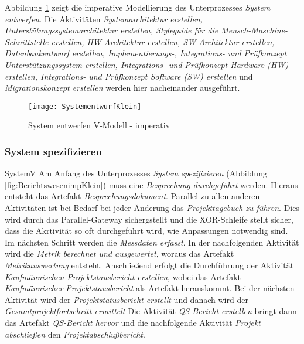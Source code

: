 Abbildung \ref{fig:SystementwurfKlein} zeigt die imperative Modellierung des Unterprozesses \textit{System entwerfen}.\newline
Die Aktivitäten \textit{Systemarchitektur erstellen, Unterstütungssystemarchitektur erstellen, Styleguide für die Mensch-Maschine-Schnittstelle erstellen, HW-Architektur erstellen, SW-Architektur erstellen, Datenbankentwurf erstellen, Implementierungs-, Integrations- und Prüfkonzept Unterstützungssystem erstellen, Integrations- und Prüfkonzept Hardware (HW) erstellen, Integrations- und Prüfkonzept Software (SW) erstellen} und \textit{Migrationskonzept erstellen} werden hier nacheinander ausgeführt.
\begin{figure}[!htbp]
\begin{center}
  \texttt{[image: SystementwurfKlein]} %
  \caption{System entwerfen V-Modell - imperativ}
  \label{fig:SystementwurfKlein}
\end{center}
\end{figure}


\subsubsection{System spezifizieren}

SystemV
Am Anfang des Unterprozesses \textit{System spezifizieren} (Abbildung \ref{fig:BerichtswesenimpKlein}) muss eine \textit{Besprechung durchgeführt} werden. Hieraus entsteht das Artefakt \textit{Besprechungsdokument}.\newline
Parallel zu allen anderen Aktivitäten ist bei Bedarf bei jeder Änderung das \textit{Projekttagebuch zu führen}. Dies wird durch das Parallel-Gateway sichergstellt und die XOR-Schleife stellt sicher, dass die Akrtivität so oft durchgeführt wird, wie Anpassungen notwendig sind. \newline
Im nächsten Schritt werden die \textit{Messdaten erfasst}.\newline
In der nachfolgenden Aktivität wird die \textit{Metrik berechnet und ausgewertet}, woraus das Artefakt \textit{Metrikauswertung} entsteht.\newline
Anschließend erfolgt die Durchführung der Aktivität \textit{Kaufmännischen Projektstausbericht erstellen}, wobei das Artefakt \textit{Kaufmännischer Projektstausbericht} als Artefakt herauskommt.\newline
Bei der nächsten Aktivität wird der \textit{Projektstatusbericht erstellt} und danach wird der \textit{Gesamtprojektfortschritt ermittelt}\newline
Die Aktivität \textit{QS-Bericht erstellen} bringt dann das Artefakt \textit{QS-Bericht hervor} und die nachfolgende Aktivität \textit{Projekt abschließen} den \textit{Projektabschlußbericht}.

